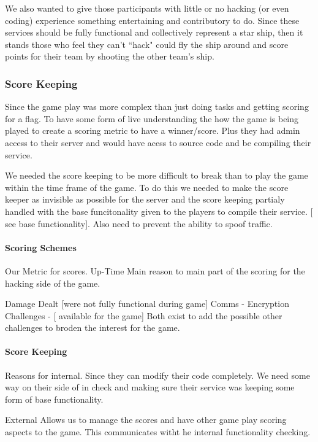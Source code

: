 \documentclass[10pt]{article}
\begin{document}
We also wanted to give those participants with little or no hacking (or even
coding) experience something entertaining and contributory to do. Since these
services should be fully functional and collectively represent a star ship, then
it stands those who feel they can't ``hack" could fly the ship around and
score points for their team by shooting the other team's ship.



\subsubsection{Score Keeping}
\label{stscorekeeping}
Since the game play was more complex than just doing tasks and getting scoring
for a flag. To have some form of live understanding the how the game is being
played to create a scoring metric to have a winner/score. Plus they had
admin access to their server and would have acess to source code and be compiling
their service.

We needed the score keeping to be more difficult to break than to play the game 
within the time frame of the game. To do this we needed to make the score keeper
as invisible as possible for the server and the score keeping partialy handled with
the base funcitonality given to the players to compile their service. [ see base 
functionality]. Also need to prevent the ability to spoof traffic.

\paragraph{Scoring Schemes}
Our Metric for scores.
Up-Time
Main reason to main part of the scoring for the hacking side of the game.

Damage Dealt [were not fully functional during game]
Comms - Encryption Challenges - [ available for the game]
Both exist to add the possible other challenges to broden the interest for the game.

\paragraph{Score Keeping}
Reasons for internal.
Since they can modify their code completely. We need some way on their side of
in check and making sure their service was keeping some form of base functionality.

External
Allows us to manage the scores and have other game play scoring aspects to the game.
This communicates witht he internal functionality checking.
\end{document}

